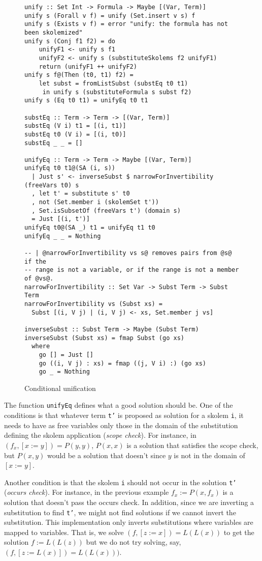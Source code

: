\documentclass[sigconf]{acmart}
\newcommand{\tc}[1]{{\small\texttt{#1}}}
\begin{document}
\begin{figure}
\begin{verbatim}
unify :: Set Int -> Formula -> Maybe [(Var, Term)]
unify s (Forall v f) = unify (Set.insert v s) f
unify s (Exists v f) = error "unify: the formula has not been skolemized"
unify s (Conj f1 f2) = do
    unifyF1 <- unify s f1
    unifyF2 <- unify s (substituteSkolems f2 unifyF1)
    return (unifyF1 ++ unifyF2)
unify s f@(Then (t0, t1) f2) =
    let subst = fromListSubst (substEq t0 t1)
     in unify s (substituteFormula s subst f2)
unify s (Eq t0 t1) = unifyEq t0 t1

substEq :: Term -> Term -> [(Var, Term)]
substEq (V i) t1 = [(i, t1)]
substEq t0 (V i) = [(i, t0)]
substEq _ _ = []

unifyEq :: Term -> Term -> Maybe [(Var, Term)]
unifyEq t0 t1@(SA (i, s))
  | Just s' <- inverseSubst $ narrowForInvertibility (freeVars t0) s
  , let t' = substitute s' t0
  , not (Set.member i (skolemSet t'))
  , Set.isSubsetOf (freeVars t') (domain s)
  = Just [(i, t')]
unifyEq t0@(SA _) t1 = unifyEq t1 t0
unifyEq _ _ = Nothing

-- | @narrowForInvertibility vs s@ removes pairs from @s@ if the
-- range is not a variable, or if the range is not a member of @vs@.
narrowForInvertibility :: Set Var -> Subst Term -> Subst Term
narrowForInvertibility vs (Subst xs) =
  Subst [(i, V j) | (i, V j) <- xs, Set.member j vs]

inverseSubst :: Subst Term -> Maybe (Subst Term)
inverseSubst (Subst xs) = fmap Subst (go xs)
  where
    go [] = Just []
    go ((i, V j) : xs) = fmap ((j, V i) :) (go xs)
    go _ = Nothing
\end{verbatim}
\caption{Conditional unification}
\label{conditional-unification}
\end{figure}

The function \tc{unifyEq} defines what a good solution should be.
One of the conditions is that whatever term \tc{t'} is proposed
as solution for a skolem \tc{i}, it needs to have as free variables only those in the
domain of the substitution defining the skolem application
(\textit{scope check}). For instance, in $(f_x , [x:=y]) = P(y,y)$,
$P(x,x)$ is a solution that satisfies the scope check, but $P(x,y)$ would be a solution
that doesn't since $y$ is not in the domain of $[x:=y]$.

Another condition is that the skolem \tc{i} should not occur in the solution
\tc{t'} (\textit{occurs check}). For instance, in the previous example
$f_x:=P(x,f_x)$ is a solution that doesn't pass the occurs check. In addition,
since we are inverting a substitution to find
\tc{t'}, we might not find solutions if we cannot invert the
substitution. This implementation only inverts substitutions where
variables are mapped to variables. That is, we solve $(f, [z:=x]) = L(L(x))$
to get the solution $f:=L(L(z))$ but we do not try solving, say, $(f, [z:=L(x)]) = L(L(x)))$.
\end{document}
